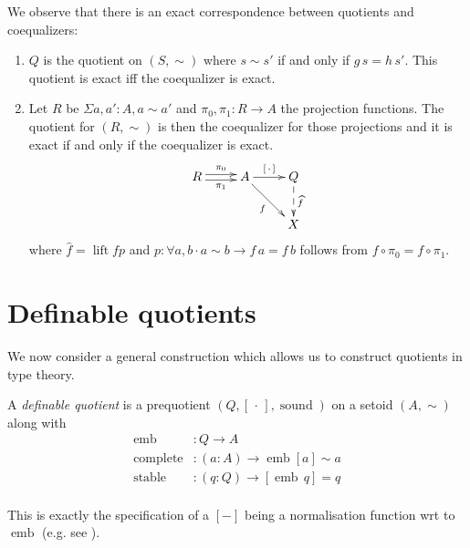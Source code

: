 \documentclass[envcountsame]{llncs}
\newcommand{\dotph}{\,\cdot\,} %
\providecommand{\class}[1]{[#1]}
\providecommand{\dlift}[1]{\widehat{#1}}
\DeclareMathOperator{\sound}{sound}
\DeclareMathOperator{\emb}{emb}
\DeclareMathOperator{\complete}{complete}
\DeclareMathOperator{\stable}{stable}
\DeclareMathOperator{\lift}{lift}
\renewcommand{\equiv}{=}
\begin{document}
We observe that there is an exact correspondence between quotients and coequalizers:
\begin{proposition}\hfill
\begin{enumerate}
\item $Q$ is the quotient on $(S,\sim)$ where $s\sim s'$ if and only if $g\,s=h\,s'$.
This quotient is exact if{f} the coequalizer is exact.
\item Let $R$ be $\Sigma a,a':A,a\sim a'$ and $\pi_0,\pi_1 : R\to A$ the projection functions. The quotient for $(R,\sim)$ is then the coequalizer for those projections and it is exact if and only if the coequalizer is exact.
\[\xymatrix{
R\ar@<0.5ex>[r]^{\pi_0}\ar@<-0.5ex>[r]_{\pi_1}& A\ar[r]^{\class\dotph}\ar[dr]_{f} & Q\ar@{-->}[d]^{\dlift f}\\
&&X
}\]
where $\dlift f=\lift f p$ and $p \colon \forall a,b\cdot a\sim b \to f\,a \equiv f\,b$ follows from $f \circ \pi_0 = f \circ \pi_1$.
\end{enumerate}
\end{proposition}

\section{Definable quotients}\label{sec:defquotients}

We now consider a general construction which allows us to construct quotients in type theory.

\begin{definition}\label{def:defquotients}
A \emph{definable quotient} is a prequotient $(Q, \class{\dotph}, \sound)$ on a setoid $(A,\sim)$ along with
\begin{align*}
\emb &: Q \to A\\
\complete &: (a : A) \to \emb {\class a} \sim a\\
\stable &: (q:Q) \to \class{\emb\,q} \equiv q\\
\end{align*}
\end{definition}

This is exactly the specification of a $\class{-}$ being a
normalisation function wrt to $\emb$ (e.g. see \cite{txa:jtait}).
\end{document}
